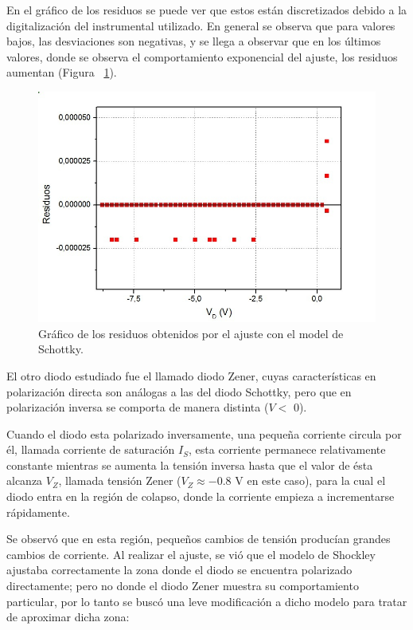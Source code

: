 \documentclass[twoside,twocolumn,a4paper]{article}
\begin{document}
En el gr\'afico de los residuos se puede ver que estos est\'an discretizados debido a la digitalizaci\'on del instrumental utilizado. En general se observa que para valores bajos, las desviaciones son negativas, y se llega a observar que en los \'ultimos valores, donde se observa el comportamiento exponencial del ajuste, los residuos aumentan (Figura ~\ref{fig:res}).

\begin{figure}[H]
\includegraphics[width=\linewidth]{residuos.jpg}
\captionsetup{justification=centering}
\caption{Gr\'afico de los residuos obtenidos por el ajuste con el model de Schottky.}
\label{fig:res}
\end{figure} 

El otro diodo estudiado fue el llamado diodo Zener, cuyas caracter\'isticas en polarizaci\'on directa son an\'alogas a las del diodo Schottky, pero que en polarizaci\'on inversa se comporta de manera distinta ($V <$ 0).


Cuando el diodo esta polarizado inversamente, una peque\~na corriente circula por \'el, llamada corriente de saturaci\'on $I_{S}$, esta corriente permanece relativamente constante mientras se aumenta la tensi\'on inversa hasta que el valor de \'esta alcanza $V_{Z}$, llamada tensi\'on Zener ($V_{Z} \approx - 0.8$ V en este caso), para la cual el diodo entra en la regi\'on de colapso, donde la corriente empieza a incrementarse r\'apidamente.

Se observ\'o que en esta regi\'on, peque\~nos cambios de tensi\'on produc\'ian grandes cambios de corriente. Al realizar el ajuste, se vi\'o que el modelo de Shockley ajustaba correctamente la zona donde el diodo se encuentra polarizado directamente; pero no donde el diodo Zener muestra su comportamiento particular, por lo tanto se busc\'o una leve modificaci\'on a dicho modelo \cite{shockley2} para tratar de aproximar dicha zona:
\end{document}
